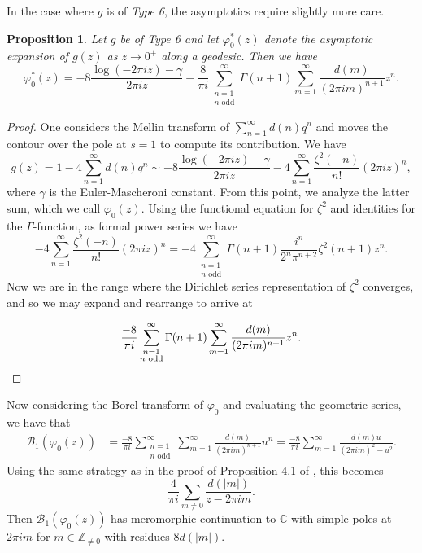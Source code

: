 \documentclass[12pt]{amsart}
\theoremstyle{definition}
\theoremstyle{plain}
\newtheorem{prop}[theorem]{Proposition}
\numberwithin{equation}{section}
\begin{document}
In the case where $g$ is of \emph{Type 6}, the asymptotics require slightly more care. 
\begin{prop} \label{prop: eisenstein asymptotic}
	Let $g$ be of Type 6 and let $\varphi^*_0(z)$ denote the asymptotic expansion of $g(z)$ as $z \to 0^+$ along a geodesic. Then we have
		\[
	\varphi^*_0(z)= -8\frac{\log(-2\pi i z)-\gamma}{2\pi i z} -\frac{8}{\pi i} \sum_{\substack{n=1 \\ n \text{ odd}}}^\infty \Gamma(n+1) \sum_{m=1}^\infty \frac{d(m)}{(2\pi im)^{n+1}} z^n.
	\]
\end{prop}

\begin{proof}
One considers the Mellin transform of $\sum_{n=1}^\infty d(n) q^n$ and moves the contour over the pole at $s=1$ to compute its contribution. We have 
\[g(z) = 1-4\sum_{n=1}^\infty d(n) q^n \sim -8\frac{\log(-2\pi i z)-\gamma}{2\pi i z} - 4 \sum_{n=1}^\infty \frac{\zeta^2(-n)}{n!}(2\pi i z)^n,
\]
where $\gamma$ is the Euler-Mascheroni constant. From this point, we analyze the latter sum, which we call $\varphi_0(z)$. Using the functional equation for $\zeta^2$ and identities for the $\Gamma$-function, as formal power series we have
\[- 4 \sum_{n=1}^\infty \frac{\zeta^2(-n)}{n!}(2\pi i z)^n = -4\sum_{\substack{n=1 \\ n \text{ odd}}}^\infty \Gamma(n+1) \frac{i^n}{2^n\pi^{n+2}} \zeta^2(n+1) z^n. 
\]
Now we are in the range where the Dirichlet series representation of $\zeta^2$ converges, and so we may expand and rearrange to arrive at

\[\frac{-8}{\pi i} \sum_{\substack{n=1 \\ n \text{ odd}}}^\infty \Gamma(n+1) \sum_{m=1}^\infty \frac{d(m)}{(2\pi im)^{n+1}} z^n. \qedhere
\]\end{proof}
Now considering the Borel transform of $\varphi_0$ and evaluating the geometric series, we have that
\begin{align*}\mathcal{B}_1(\varphi_0(z)) &= \frac{-8}{\pi i} \sum_{\substack{n=1 \\ n \text{ odd}}}^\infty \sum_{m=1}^\infty \frac{d(m)}{(2\pi im)^{n+1}} u^n 
=  \frac{-8}{\pi i} \sum_{m=1}^\infty \frac{d(m)u}{(2\pi im)^{2} -u^2}.
\end{align*}
Using the same strategy as in the proof of Proposition 4.1 of \cite{fantini-rella}, this becomes
\[\frac{4}{\pi i} \sum_{m\neq 0} \frac{d(|m|)}{z-2\pi i m}.
\]
Then $\mathcal{B}_1(\varphi_0(z))$ has meromorphic continuation to $\mathbb{C}$ with simple poles at $2\pi i m$ for $m \in \mathbb{Z}_{\neq 0}$ with residues $8d(|m|)$. 
\end{document}

